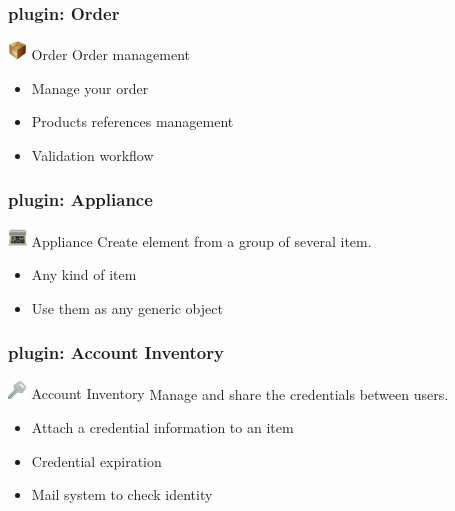 \documentclass{beamer}
\begin{document}
\begin{frame}
    \frametitle{plugin: Order}
    
    \begin{block}{\includegraphics[height=0.5cm]{./pics/plugins/order.jpg} Order}
        Order management 
        \begin{itemize}
            \item Manage your order
            \item Products references management
            \item Validation workflow
        \end{itemize}
    \end{block}

\end{frame}


\begin{frame}
    \frametitle{plugin: Appliance}
    
    \begin{block}{\includegraphics[height=0.5cm]{./pics/plugins/appliance.jpg} Appliance}
        Create element from a group of several item.
        \begin{itemize}
            \item Any kind of item 
            \item Use them as any generic object 
        \end{itemize}
    \end{block}

\end{frame}

\begin{frame}
    \frametitle{plugin: Account Inventory}
    
    \begin{block}{\includegraphics[height=0.5cm]{./pics/plugins/account.jpg} Account Inventory}
        Manage and share the credentials between users.
        \begin{itemize}
            \item Attach a credential information to an item 
            \item Credential expiration
            \item Mail system to check identity
        \end{itemize}
    \end{block}

\end{frame}
\end{document}
